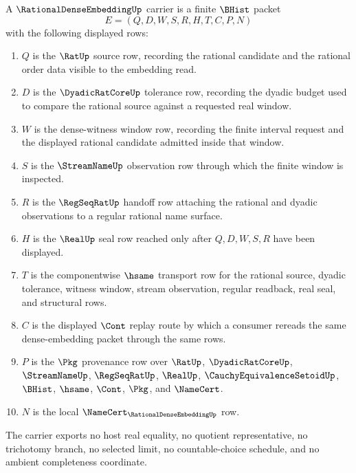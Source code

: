 \begin{definition}
\label{def:rational-dense-embedding-carrier}
A $\RationalDenseEmbeddingUp$ carrier is a finite $\BHist$ packet
$$
E=(Q,D,W,S,R,H,T,C,P,N)
$$
with the following displayed rows:
\begin{enumerate}
\item $Q$ is the $\RatUp$ source row, recording the rational candidate and the rational order data visible to the embedding read.
\item $D$ is the $\DyadicRatCoreUp$ tolerance row, recording the dyadic budget used to compare the rational source against a requested real window.
\item $W$ is the dense-witness window row, recording the finite interval request and the displayed rational candidate admitted inside that window.
\item $S$ is the $\StreamNameUp$ observation row through which the finite window is inspected.
\item $R$ is the $\RegSeqRatUp$ handoff row attaching the rational and dyadic observations to a regular rational name surface.
\item $H$ is the $\RealUp$ seal row reached only after $Q,D,W,S,R$ have been displayed.
\item $T$ is the componentwise $\hsame$ transport row for the rational source, dyadic tolerance, witness window, stream observation, regular readback, real seal, and structural rows.
\item $C$ is the displayed $\Cont$ replay route by which a consumer rereads the same dense-embedding packet through the same rows.
\item $P$ is the $\Pkg$ provenance row over $\RatUp$, $\DyadicRatCoreUp$, $\StreamNameUp$, $\RegSeqRatUp$, $\RealUp$, $\CauchyEquivalenceSetoidUp$, $\BHist$, $\hsame$, $\Cont$, $\Pkg$, and $\NameCert$.
\item $N$ is the local $\NameCert_{\RationalDenseEmbeddingUp}$ row.
\end{enumerate}
The carrier exports no host real equality, no quotient representative, no trichotomy branch, no selected limit, no countable-choice schedule, and no ambient completeness coordinate.
\end{definition}

